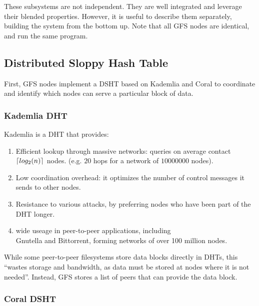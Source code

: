 \documentclass{sig-alternate}
\DeclarePairedDelimiter{\ceil}{\lceil}{\rceil}
\begin{document}
These subsystems are not independent. They are well integrated and leverage
their blended properties. However, it is useful to describe them separately,
building the system from the bottom up. Note that all GFS nodes are identical,
and run the same program.

\subsection{Distributed Sloppy Hash Table}

First, GFS nodes implement a DSHT based on Kademlia and Coral to coordinate
and identify which nodes can serve a particular block of data.

\subsubsection{Kademlia DHT}

Kademlia is a DHT that provides:

\begin{enumerate}

  \item Efficient lookup through massive networks:
        queries on average contact $ \ceil{log_2 (n)} $ nodes.
        (e.g. $20$ hops for a network of $10000000$ nodes).

  \item Low coordination overhead: it optimizes the number of
        control messages it sends to other nodes.

  \item Resistance to various attacks, by preferring nodes who have been
        part of the DHT longer.

  \item wide useage in peer-to-peer applications, including \\
        Gnutella and Bittorrent, forming networks of over 100 million nodes.

 \end{enumerate}

While some peer-to-peer filesystems store data blocks directly in DHTs,
this ``wastes storage and bandwidth, as data must be stored at nodes where it
is not needed''. Instead, GFS stores a list of peers that can provide the data block.

\subsubsection{Coral DSHT}
\end{document}
